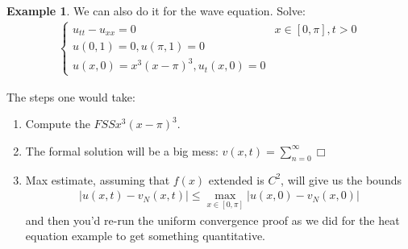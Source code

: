\documentclass[11pt]{scrartcl}
\theoremstyle{definition}
\newtheorem{ex}{Example}
\theoremstyle{remark}
\begin{document}
	
	\begin{ex}
		We can also do it for the wave equation. Solve:
		\begin{align*}
			\begin{cases}
				u_{tt}-u_{xx} = 0 & x \in [0,\pi], t > 0 \\
				u(0,1) = 0, u(\pi,1) = 0 \\
				u(x,0) = x^3(x-\pi)^3, u_t(x,0) = 0 
			\end{cases}
		\end{align*}
	\end{ex}
	The steps one would take:
	\begin{enumerate}[noitemsep]
		\item Compute the $FSS x^3(x-\pi)^3$. 
		\item The formal solution will be a big mess: $v(x,t) = \sum_{n=0}^\infty \Box$ 
		\item Max estimate, assuming that $f(x)$ extended is $C^2$, will give us the bounds
		\begin{align*}
			|u(x,t) - v_N(x,t)| \leq \max_{x \in [0,\pi]} |u(x,0) - v_N(x,0)| 
		\end{align*}
		and then you'd re-run the uniform convergence proof as we did for the heat equation example to get something quantitative.  
	\end{enumerate}
\end{document}
